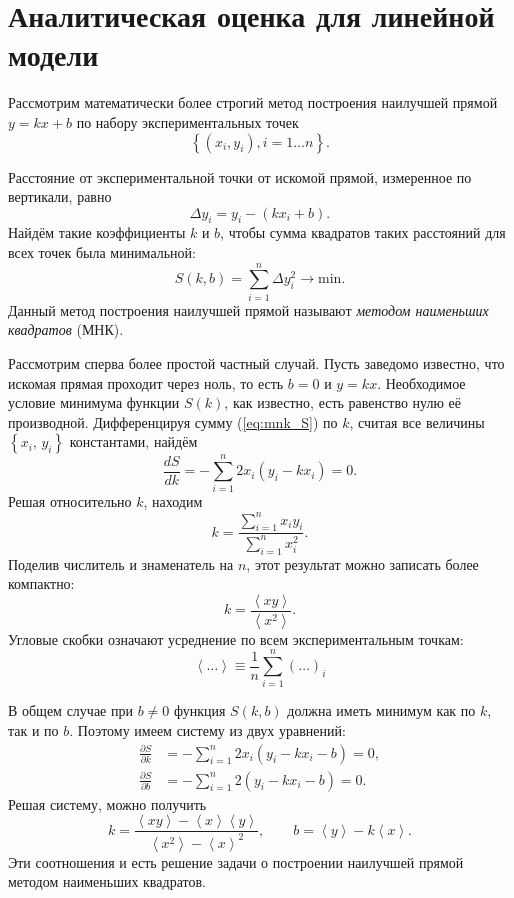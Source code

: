 \section{Аналитическая оценка для линейной модели}

Рассмотрим математически более строгий метод построения наилучшей
прямой $y=kx+b$ по набору экспериментальных точек
\[
\left\{ \left(x_{i},y_{i}\right),i=1\ldots n\right\} .
\]

Расстояние от экспериментальной точки от искомой прямой, измеренное
по вертикали, равно
\[
\Delta y_{i}=y_{i}-\left(kx_{i}+b\right).
\]
Найдём такие коэффициенты $k$ и $b$, чтобы сумма квадратов таких
расстояний для всех точек была минимальной:
\begin{equation}
S\!\left(k,b\right)=\sum\limits _{i=1}^{n}\Delta y_{i}^{2}\to\mathrm{min}.\label{eq:mnk_S}
\end{equation}
Данный метод построения наилучшей прямой называют \emph{методом наименьших
квадратов} (МНК).

Рассмотрим сперва более простой частный случай. Пусть заведомо известно,
что искомая прямая проходит через ноль, то есть $b=0$ и $y=kx$.
Необходимое условие минимума функции $S\left(k\right)$, как известно,
есть равенство нулю её производной. Дифференцируя сумму (\ref{eq:mnk_S})
по $k$, считая все величины $\left\{ x_{i},\,y_{i}\right\} $ константами,
найдём
\[
\frac{dS}{dk}=-\sum\limits _{i=1}^{n}2x_{i}\left(y_{i}-kx_{i}\right)=0.
\]
Решая относительно $k$, находим
\[
k=\frac{\sum\limits _{i=1}^{n}x_{i}y_{i}}{\sum\limits _{i=1}^{n}x_{i}^{2}}.
\]
Поделив числитель и знаменатель на $n$, этот результат можно записать
более компактно:
\begin{equation}
\boxed{k=\frac{\left\langle xy\right\rangle }{\left\langle x^{2}\right\rangle }}.\label{eq:MNK0}
\end{equation}
Угловые скобки означают усреднение по всем экспериментальным точкам:
\[
\left\langle \ldots\right\rangle \equiv\frac{1}{n}\sum\limits _{i=1}^{n}\left(\ldots\right)_{i}
\]

В общем случае при $b\ne0$ функция $S\left(k,b\right)$ должна иметь
минимум как по $k$, так и по $b$. Поэтому имеем систему из двух
уравнений:
\begin{align*}
\frac{\partial S}{\partial k} & =-\sum\limits _{i=1}^{n}2x_{i}\left(y_{i}-kx_{i}-b\right)=0,\\
\frac{\partial S}{\partial b} & =-\sum\limits _{i=1}^{n}2\left(y_{i}-kx_{i}-b\right)=0.
\end{align*}
Решая систему, можно получить
\begin{equation}
\boxed{k=\frac{\left\langle xy\right\rangle -\left\langle x\right\rangle \left\langle y\right\rangle }{\left\langle x^{2}\right\rangle -\left\langle x\right\rangle ^{2}},\qquad b=\left\langle y\right\rangle -k\left\langle x\right\rangle }.\label{eq:MNK}
\end{equation}
Эти соотношения и есть решение задачи о построении наилучшей прямой
методом наименьших квадратов.

